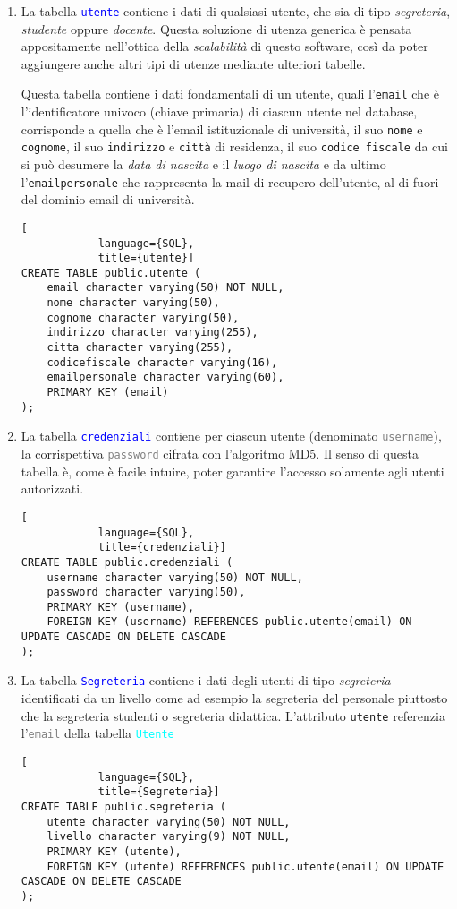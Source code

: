 \documentclass{article}
\newcommand{\tabb}[1]{\texttt{\textcolor{blue}{#1}}}
\newcommand{\tab}[1]{\texttt{\textcolor{cyan}{#1}}}
\newcommand{\attr}[1]{\texttt{\textcolor{gray}{#1}}}
\begin{document}
    \begin{enumerate}
        \item La tabella \tabb{utente} contiene i dati di qualsiasi utente, che sia di tipo \emph{segreteria}, \emph{studente} oppure \emph{docente}. Questa soluzione di utenza generica è pensata appositamente nell'ottica della \emph{scalabilità} di questo software, così da poter aggiungere anche altri tipi di utenze mediante ulteriori tabelle.

        Questa tabella contiene i dati fondamentali di un utente, quali l'\texttt{email} che è l'identificatore univoco (chiave primaria) di ciascun utente nel database, corrisponde a quella che è l'email istituzionale di università, il suo \texttt{nome} e \texttt{cognome}, il suo \texttt{indirizzo} e \texttt{città} di residenza, il suo \texttt{codice fiscale} da cui si può desumere la \textit{data di nascita} e il \textit{luogo di nascita} e da ultimo l'\texttt{emailpersonale} che rappresenta la mail di recupero dell'utente, al di fuori del dominio email di università.
        \begin{lstlisting}[
            language={SQL},
            title={utente}]
CREATE TABLE public.utente (
    email character varying(50) NOT NULL,
    nome character varying(50),
    cognome character varying(50),
    indirizzo character varying(255),
    citta character varying(255),
    codicefiscale character varying(16),
    emailpersonale character varying(60),
    PRIMARY KEY (email)
);
        \end{lstlisting}

        \item La tabella \tabb{credenziali} contiene per ciascun utente (denominato \attr{username}), la corrispettiva \attr{password} cifrata con l'algoritmo MD5. Il senso di questa tabella è, come è facile intuire, poter garantire l'accesso solamente agli utenti autorizzati.
        \begin{lstlisting}[
            language={SQL},
            title={credenziali}]
CREATE TABLE public.credenziali (
    username character varying(50) NOT NULL,
    password character varying(50),
    PRIMARY KEY (username),
    FOREIGN KEY (username) REFERENCES public.utente(email) ON UPDATE CASCADE ON DELETE CASCADE
);
        \end{lstlisting}

        \pagebreak

        \item La tabella \tabb{Segreteria} contiene i dati degli utenti di tipo \textit{segreteria} identificati da un livello come ad esempio la segreteria del personale piuttosto che la segreteria studenti o segreteria didattica. L'attributo \texttt{utente} referenzia l'\attr{email} della tabella \tab{Utente}
        \begin{lstlisting}[
            language={SQL},
            title={Segreteria}]
CREATE TABLE public.segreteria (
    utente character varying(50) NOT NULL,
    livello character varying(9) NOT NULL,
    PRIMARY KEY (utente),
    FOREIGN KEY (utente) REFERENCES public.utente(email) ON UPDATE CASCADE ON DELETE CASCADE
);
        \end{lstlisting}


\end{enumerate}
\end{document}
